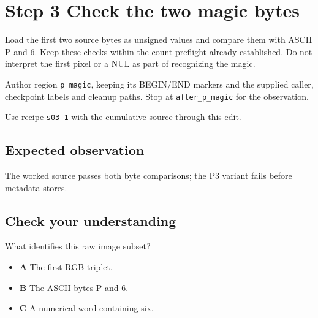 \section{Step 3 Check the two magic bytes}\label{ppm-s03}

Load the first two source bytes as unsigned values and compare them with ASCII P and 6. Keep these checks within the count preflight already established. Do not interpret the first pixel or a NUL as part of recognizing the magic.

Author region \texttt{p\_magic}, keeping its BEGIN/END markers and the supplied caller, checkpoint labels and cleanup paths. Stop at \texttt{after\_p\_magic} for the observation.

Use recipe \texttt{s03-1} with the cumulative source through this edit.

\subsection{Expected observation}
The worked source passes both byte comparisons; the P3 variant fails before metadata stores.

\subsection{Check your understanding}
What identifies this raw image subset?

\begin{itemize}
\item \textbf{A} The first RGB triplet.
\item \textbf{B} The ASCII bytes P and 6.
\item \textbf{C} A numerical word containing six.
\end{itemize}
